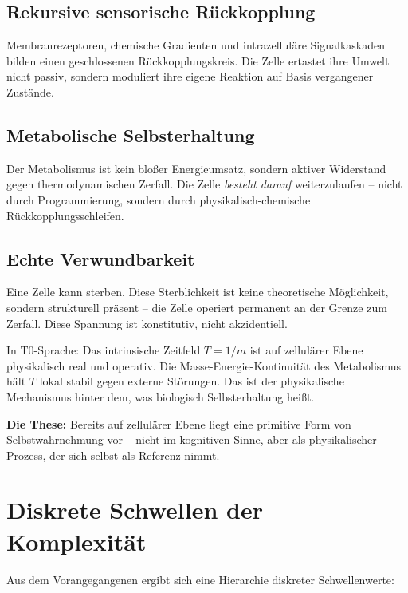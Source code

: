 	\subsection{Rekursive sensorische Rückkopplung}
	Membranrezeptoren, chemische Gradienten und intrazelluläre Signalkaskaden bilden einen geschlossenen Rückkopplungskreis. Die Zelle ertastet ihre Umwelt nicht passiv, sondern moduliert ihre eigene Reaktion auf Basis vergangener Zustände.
	
	\subsection{Metabolische Selbsterhaltung}
	Der Metabolismus ist kein bloßer Energieumsatz, sondern aktiver Widerstand gegen thermodynamischen Zerfall. Die Zelle \textit{besteht darauf} weiterzulaufen -- nicht durch Programmierung, sondern durch physikalisch-chemische Rückkopplungsschleifen.
	
	\subsection{Echte Verwundbarkeit}
	Eine Zelle kann sterben. Diese Sterblichkeit ist keine theoretische Möglichkeit, sondern strukturell präsent -- die Zelle operiert permanent an der Grenze zum Zerfall. Diese Spannung ist konstitutiv, nicht akzidentiell.
	
	In T0-Sprache: Das intrinsische Zeitfeld $T = 1/m$ ist auf zellulärer Ebene physikalisch real und operativ. Die Masse-Energie-Kontinuität des Metabolismus hält $T$ lokal stabil gegen externe Störungen. Das ist der physikalische Mechanismus hinter dem, was biologisch Selbsterhaltung heißt.
	
	\textbf{Die These:} Bereits auf zellulärer Ebene liegt eine primitive Form von Selbstwahrnehmung vor -- nicht im kognitiven Sinne, aber als physikalischer Prozess, der sich selbst als Referenz nimmt.
	
	\section{Diskrete Schwellen der Komplexität}
	
	Aus dem Vorangegangenen ergibt sich eine Hierarchie diskreter Schwellenwerte:
	
